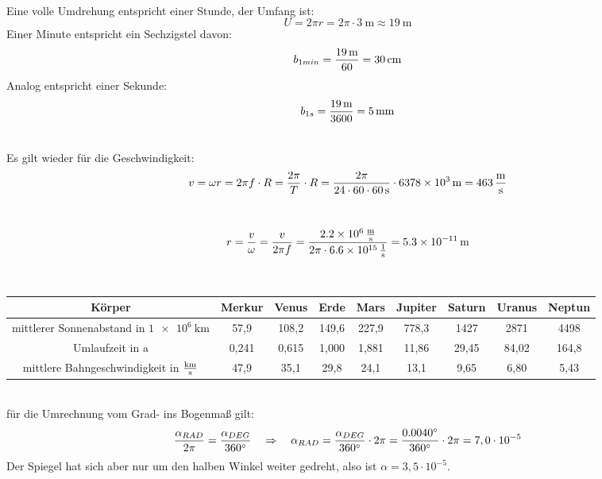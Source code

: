 \documentclass[a4paper]{article}
\begin{document}
\\
Eine volle Umdrehung entspricht einer Stunde, der Umfang ist:
$$U=2\pi r = 2 \pi \cdot \SI{3}{\meter} \approx \SI{19}{\meter}$$
Einer Minute entspricht ein Sechzigstel davon:
$$b_{1min} = {\SI{19}{\meter} \over 60}=\SI{30}{\centi\meter}$$
Analog entspricht einer Sekunde:
$$b_{1s}=  {\SI{19}{\meter} \over 3600}=\SI{5}{\milli\meter}$$
\vspace{0.5 cm}

\\
Es gilt wieder für die Geschwindigkeit:
$$v=\omega r = 2 \pi f \cdot R = {2 \pi \over T} \cdot R = {{}2\pi \over 24 \cdot 60 \cdot \SI{60}{\second}} \cdot  \SI{6378e3}{\meter} = \SI{463}{\meter\over\second}$$
\vspace{0.5 cm}

\\
$$r = {v \over \omega} ={v \over 2\pi f}= {\SI{2,2e6}{\meter\over\second} \over 2 \pi \cdot \SI{6,6e15}{1\over\second}}= \SI{5,3e-11}{\meter}$$
\vspace{0.5 cm}

\\ 
\renewcommand{\arraystretch}{2}
\begin{tabular}{|c|c|c|c|c|c|c|c|c|}
	\hline
	Körper & Merkur & Venus & Erde & Mars & Jupiter & Saturn & Uranus & Neptun \\
	\hline
	mittlerer Sonnenabstand in $\SI{1e6}{\kilo\meter}$ & 57,9 & 108,2 & 149,6 & 227,9 & 778,3 & 1427 & 2871 & 4498\\
	\hline
	Umlaufzeit in a & 0,241 & 0,615 & 1,000 & 1,881 &11,86 &29,45 & 84,02 & 164,8\\
	\hline
	mittlere Bahngeschwindigkeit in $\SI{}{\kilo\meter\over \second}$ & 47,9 & 35,1 & 29,8 & 24,1 & 13,1& 9,65 & 6,80 & 5,43\\
	\hline
\end{tabular}
\vspace{0.5 cm}

\\
für die Umrechnung vom Grad- ins Bogenmaß gilt:
$${\alpha_{RAD} \over 2\pi} = {\alpha_{DEG} \over \SI{360}{\degree}} \quad \Rightarrow \quad 
\alpha_{RAD}={\alpha_{DEG} \over \SI{360}{\degree}}\cdot 2\pi = {\SI{0,0040}{\degree} \over \SI{360}{\degree}} \cdot 2 \pi = 7,0 \cdot 10^{-5}$$
Der Spiegel hat sich aber nur um den halben Winkel weiter gedreht, also ist $\alpha= 3,5\cdot 10^{-5}$.
\vspace{0.5 cm}
\end{document}
